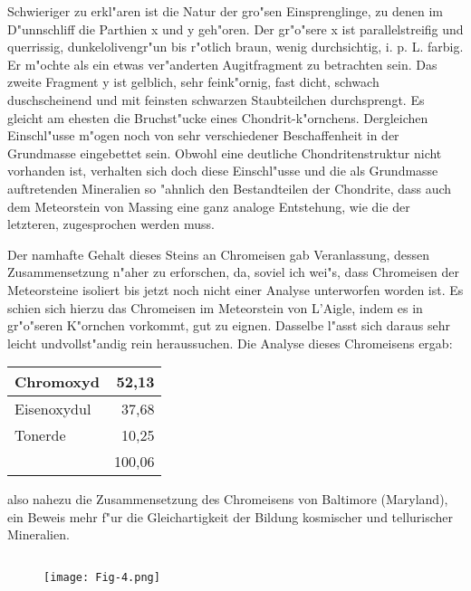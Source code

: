 \documentclass[a4paper, 11pt, oneside]{article}
\begin{document}
Schwieriger zu erkl"aren ist die Natur der gro"sen Einsprenglinge, zu denen im D"unnschliff die Parthien x und y geh"oren. Der gr"o"sere x ist parallelstreifig und querrissig, dunkelolivengr"un bis r"otlich braun, wenig durchsichtig, i. p. L. farbig. Er m"ochte als ein etwas ver"anderten Augitfragment zu betrachten sein. Das zweite Fragment y ist gelblich, sehr feink"ornig, fast dicht, schwach duschscheinend und mit feinsten schwarzen Staubteilchen durchsprengt. Es gleicht am ehesten die Bruchst"ucke eines Chondrit-k"ornchens. Dergleichen Einschl"usse m"ogen noch von sehr verschiedener Beschaffenheit in der Grundmasse eingebettet sein. Obwohl eine deutliche Chondritenstruktur nicht vorhanden ist, verhalten sich doch diese Einschl"usse und die als Grundmasse auftretenden Mineralien so "ahnlich den Bestandteilen der Chondrite, dass auch dem Meteorstein von Massing eine ganz analoge Entstehung, wie die der letzteren, zugesprochen werden muss.

Der namhafte Gehalt dieses Steins an Chromeisen gab Veranlassung, dessen Zusammensetzung n"aher zu erforschen, da, soviel ich wei"s, dass Chromeisen der Meteorsteine isoliert bis jetzt noch nicht einer Analyse unterworfen worden ist. Es schien sich hierzu das Chromeisen im Meteorstein von L'Aigle, indem es in gr"o"seren K"ornchen vorkommt, gut zu eignen. Dasselbe l"asst sich daraus sehr leicht undvollst"andig rein heraussuchen. Die Analyse dieses Chromeisens ergab:
\begin{center}
    \begin{tabular}{ |l|r| } 
    \hline
    Chromoxyd & 52,13\\\hline
    Eisenoxydul & 37,68\\\hline
    Tonerde & 10,25\\\hline
    & 100,06\\
    \hline
    \end{tabular}
\end{center}
also nahezu die Zusammensetzung des Chromeisens von Baltimore (Maryland), ein Beweis mehr f"ur die Gleichartigkeit der Bildung kosmischer und tellurischer Mineralien.
\clearpage
\subsection{}
\begin{figure}[h]
\centering
\texttt{[image: Fig-4.png]}
\caption{}
\end{figure}
\end{document}
